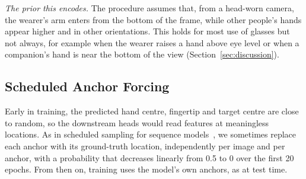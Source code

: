 \emph{The prior this encodes.} The procedure assumes that, from a head-worn camera, the wearer's arm enters from the bottom of the frame, while other people's hands appear higher and in other orientations. This holds for most use of glasses but not always, for example when the wearer raises a hand above eye level or when a companion's hand is near the bottom of the view (Section~\ref{sec:discussion}).

\subsection{Scheduled Anchor Forcing}\label{sec:forcing}
Early in training, the predicted hand centre, fingertip and target centre are close to random, so the downstream heads would read features at meaningless locations. As in scheduled sampling for sequence models~\cite{bengio2015scheduled}, we sometimes replace each anchor with its ground-truth location, independently per image and per anchor, with a probability that decreases linearly from 0.5 to 0 over the first 20 epochs. From then on, training uses the model's own anchors, as at test time.
